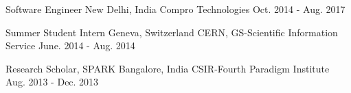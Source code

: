 

\begin{cventries}

  \cvexperience
    {Software Engineer} %
    {New Delhi, India} %
    {Compro Technologies} %
    {Oct. 2014 - Aug. 2017} %

  \cvexperience
    {Summer Student Intern} %
    {Geneva, Switzerland} %
    {CERN, GS-Scientific Information Service} %
    {June. 2014 - Aug. 2014} %

  \cvexperience
    {Research Scholar, SPARK} %
    {Bangalore, India} %
    {CSIR-Fourth Paradigm Institute} %
    {Aug. 2013 - Dec. 2013} %

\end{cventries}
